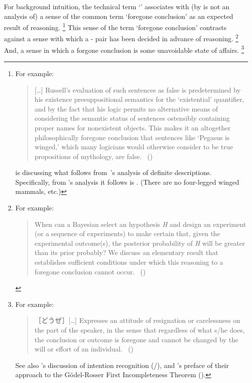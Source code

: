 \begin{note}
  For background intuition, the technical term `\fc{}' associates with (by is not an analysis of) a sense of the common term `foregone conclusion' as an expected result of reasoning.%
  \footnote{
    For example:

    \begin{quote}
      [\dots] Russell's evaluation of such sentences as false is predetermined by his existence presuppositional semantics for the ‘existential' quantifier, and by the fact that his logic permits no alternative means of considering the semantic status of sentences ostensibly containing proper names for nonexistent objects.
      This makes it an altogether philosophically foregone conclusion that sentences like ‘Pegasus is winged,' which many logicians would otherwise consider to be true propositions of mythology, are false.%
      \mbox{ }\hfill\mbox{(\cite[6]{Jacquette:2002up})}
    \end{quote}

    \noindent \citeauthor{Jacquette:2002up} is discussing what follows from~\citeauthor{Russell:1905aa}'s analysis of definite descriptions.
    Specifically, from \citeauthor{Russell:1905aa}'s analysis it follows  is .
    (There are no four-legged winged mammals, etc.)
  }
  This sense of the term `foregone conclusion' contrasts against a sense with which a - pair has been decided in advance of reasoning.%
  \footnote{
    For example:
    \begin{quote}
      When can a Bayesian select an hypothesis \emph{H} and design an experiment (or a sequence of experiments) to make certain that, given the experimental outcome(s), the posterior probability of \emph{H} will be greater than its prior probably?
      We discuss an elementary result that establishes sufficient conditions under which this reasoning to a foregone conclusion cannot occur.%
      \mbox{ }\hfill\mbox{(\cite[1228]{Kadane:1996vu})}
    \end{quote}
  }
  And, a sense in which a forgone conclusion is some unavoidable state of affairs.%
  \footnote{
    For example:
    \begin{quote}
      ［どうぜ］[\dots] Expresses an attitude of resignation or carelessness on the part of the speaker, in the sense that regardless of what s/he does, the conclusion or outcome is foregone and cannot be changed by the will or effort of an individual.%
      \mbox{ }\hfill\mbox{(\cite[332--333]{kurufushamashii:2015un})}
    \end{quote}
    See also \citeauthor{Grice:1957vg}'s discussion of intention recognition (\citeyear[385]{Grice:1957vg}/\citeyear[219]{Grice:1989uf}), and \citeauthor{Machover:1996vu}'s preface of their approach to the G\"{o}del-Rosser First Incompleteness Theorem (\citeyear[viii]{Machover:1996vu}).
  }
\end{note}


